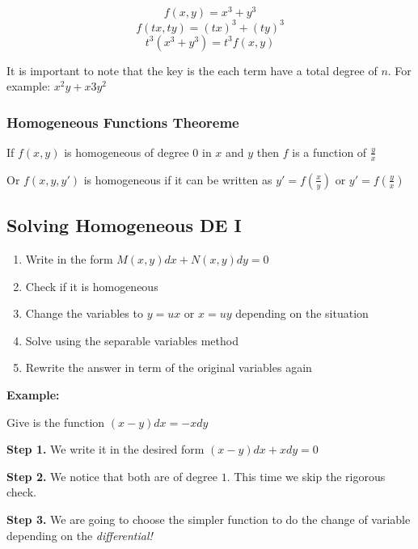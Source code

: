 \[f(x,y) = x^3 + y^3\]
\[f(tx, ty) = {(tx)}^3 + {(ty)}^3\]
\[t^3 (x^3 + y^3) = t^3 f(x,y)\]

It is important to note that the key is the each term have a total degree of \(n\).
For example: \(x^2y + x3y^2\)

\subsubsection{Homogeneous Functions Theoreme}

If \(f(x,y)\) is homogeneous of degree \(0\) in \(x\) and \(y\) then 
\(f\) is a function of \(\frac{y}{x}\)

Or \(f(x,y,y')\) is homogeneous if it can be written as \(y' = f(\frac{x}{y})\) or \(y' = f(\frac{y}{x})\)

\subsection{Solving Homogeneous DE I}

\begin{enumerate}
    \item Write in the form \(M(x,y)dx + N(x,y)dy = 0\)
    \item Check if it is homogeneous
    \item Change the variables to \(y = ux\) or \(x = uy\) depending on the situation
    \item Solve using the separable variables method
    \item Rewrite the answer in term of the original variables again
\end{enumerate}

\textbf{Example:}
\vspace{\baselineskip}


Give is the function \((x -y)dx = - xdy\)
\vspace{\baselineskip}

\textbf{Step 1.} We write it in the desired form \((x - y)dx + xdy = 0\)
\vspace{\baselineskip}

\textbf{Step 2.} We notice that both are of degree \(1\). This time we skip the rigorous check.
\vspace{\baselineskip}

\textbf{Step 3.} We are going to choose the simpler function to do the change of variable 
depending on the \emph{differential!} 
\vspace{\baselineskip}

